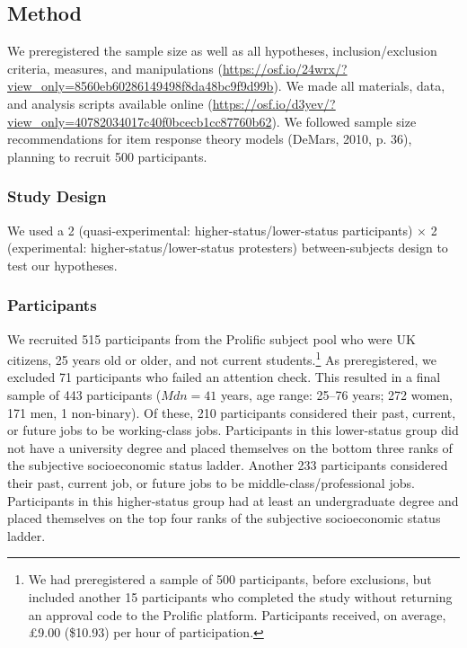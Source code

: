 \documentclass[twocolumn, 11pt, letterpaper]{article}
\begin{document}
\hypertarget{method}{%
\subsection{Method}\label{method}}

We preregistered the sample size as well as all hypotheses,
inclusion/exclusion criteria, measures, and manipulations
(\url{https://osf.io/24wrx/?view_only=8560eb60286149498f8da48bc9f9d99b}).
We made all materials, data, and analysis scripts available online
(\url{https://osf.io/d3yev/?view_only=40782034017c40f0bcecb1cc87760b62}).
We followed sample size recommendations for item response theory models
(DeMars, 2010, p. 36), planning to recruit 500 participants.

\hypertarget{study-design}{%
\subsubsection{Study Design}\label{study-design}}

We used a 2 (quasi-experimental: higher-status/lower-status
participants) \(\times\) 2 (experimental: higher-status/lower-status
protesters) between-subjects design to test our hypotheses.

\hypertarget{participants}{%
\subsubsection{Participants}\label{participants}}

We recruited 515 participants from the Prolific subject pool who were UK
citizens, 25 years old or older, and not current students.\footnote{We
  had preregistered a sample of 500 participants, before exclusions, but
  included another 15 participants who completed the study without
  returning an approval code to the Prolific platform. Participants
  received, on average, \pounds 9.00 (\$10.93) per hour of
  participation.} As preregistered, we excluded 71 participants who
failed an attention check. This resulted in a final sample of 443
participants (\(\textit{Mdn} = 41\) years, age range: 25--76 years; 272
women, 171 men, 1 non-binary). Of these, 210 participants considered
their past, current, or future jobs to be working-class jobs.
Participants in this lower-status group did not have a university degree
and placed themselves on the bottom three ranks of the subjective
socioeconomic status ladder. Another 233 participants considered their
past, current job, or future jobs to be middle-class/professional jobs.
Participants in this higher-status group had at least an undergraduate
degree and placed themselves on the top four ranks of the subjective
socioeconomic status ladder.
\end{document}
